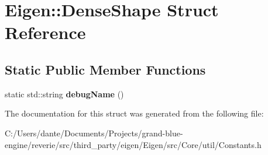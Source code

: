 \hypertarget{struct_eigen_1_1_dense_shape}{}\section{Eigen\+::Dense\+Shape Struct Reference}
\label{struct_eigen_1_1_dense_shape}
\subsection*{Static Public Member Functions}
\begin{DoxyCompactItemize}
\item 
\mbox{\label{struct_eigen_1_1_dense_shape_ad56c4d75fae06c49cf2bd45f5814b8ed}} 
static std\+::string {\bfseries debug\+Name} ()
\end{DoxyCompactItemize}


The documentation for this struct was generated from the following file\+:\begin{DoxyCompactItemize}
\item 
C\+:/\+Users/dante/\+Documents/\+Projects/grand-\/blue-\/engine/reverie/src/third\+\_\+party/eigen/\+Eigen/src/\+Core/util/Constants.\+h\end{DoxyCompactItemize}
